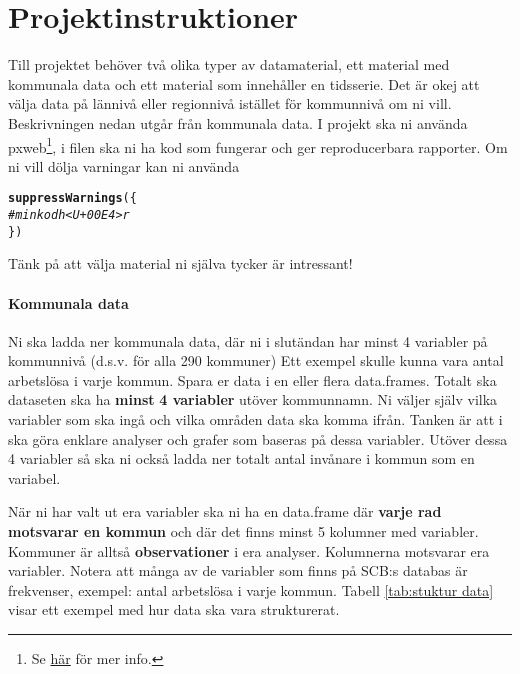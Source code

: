 \documentclass[swedish,english]{article}\usepackage[]{graphicx}\usepackage[]{xcolor}
\makeatletter
\newcommand{\hlcom}[1]{\textcolor[rgb]{0.678,0.584,0.686}{\textit{#1}}}%
\newcommand{\hlstd}[1]{\textcolor[rgb]{0.345,0.345,0.345}{#1}}%
\newcommand{\hlkwd}[1]{\textcolor[rgb]{0.737,0.353,0.396}{\textbf{#1}}}%
\newenvironment{kframe}{%
 \def\at@end@of@kframe{}%
 \ifinner\ifhmode%
  \def\at@end@of@kframe{\end{minipage}}%
  \begin{minipage}{\columnwidth}%
 \fi\fi%
 \def\FrameCommand##1{\hskip\@totalleftmargin \hskip-\fboxsep
 \colorbox{shadecolor}{##1}\hskip-\fboxsep
     \hskip-\linewidth \hskip-\@totalleftmargin \hskip\columnwidth}%
 \MakeFramed {\advance\hsize-\width
   \@totalleftmargin\z@ \linewidth\hsize
   \@setminipage}}%
 {\par\unskip\endMakeFramed%
 \at@end@of@kframe}
\newenvironment{knitrout}{}{} %
\makeatother
\begin{document}
\section{Projektinstruktioner}

Till projektet behöver två olika typer av datamaterial, ett material
med kommunala data och ett material som innehåller en tidsserie. Det
är okej att välja data på lännivå eller regionnivå istället för kommunnivå
om ni vill. Beskrivningen nedan utgår från kommunala data. I projekt
ska ni använda pxweb\footnote{Se \href{https://cran.r-project.org/web/packages/pxweb/vignettes/pxweb.html}{här}
för mer info.}, i filen ska ni ha kod som fungerar och ger reproducerbara rapporter.
Om ni vill dölja varningar kan ni använda

\begin{swedish}%
\begin{knitrout}
\color{fgcolor}\begin{kframe}
\begin{alltt}
\hlkwd{suppressWarnings}\hlstd{(\{}
        \hlcom{# min kod h<U+00E4>r  }
\hlstd{\})}
\end{alltt}
\end{kframe}
\end{knitrout}

\end{swedish}%
Tänk på att välja material ni själva tycker är intressant!

\paragraph{Kommunala data}

Ni ska ladda ner kommunala data, där ni i slutändan har minst 4 variabler
på kommunnivå (d.s.v. för alla 290 kommuner) Ett exempel skulle kunna
vara antal arbetslösa i varje kommun. Spara er data i en eller flera
data.frames. Totalt ska dataseten ska ha \textbf{minst} \textbf{4
variabler} utöver kommunnamn. Ni väljer själv vilka variabler som
ska ingå och vilka områden data ska komma ifrån. Tanken är att i ska
göra enklare analyser och grafer som baseras på dessa variabler. Utöver
dessa 4 variabler så ska ni också ladda ner totalt antal invånare
i kommun som en variabel. 

När ni har valt ut era variabler ska ni ha en data.frame där \textbf{varje
rad motsvarar en kommun} och där det finns minst 5 kolumner med variabler.
Kommuner är alltså \textbf{observationer} i era analyser. Kolumnerna
motsvarar era variabler. Notera att många av de variabler som finns
på SCB:s databas är frekvenser, exempel: antal arbetslösa i varje
kommun. Tabell \ref{tab:stuktur data} visar ett exempel med hur data
ska vara strukturerat.
\end{document}
